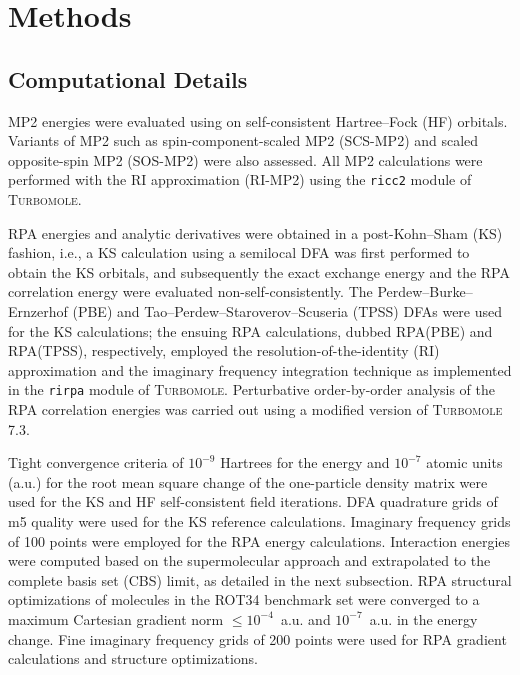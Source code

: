 \documentclass[journal=jctcce,manuscript=article]{achemso}
\begin{document}
\section{Methods}
\label{sec:methods}
\subsection{Computational Details}

MP2 energies were evaluated using on self-consistent Hartree--Fock (HF)
orbitals. 
Variants of MP2 such as spin-component-scaled MP2 (SCS-MP2)\cite{Grimme03JChemPhys118p9095}
and scaled opposite-spin MP2 (SOS-MP2)\cite{doi:10.1063/1.1809602} were also assessed.
All MP2 calculations were performed with the RI approximation (RI-MP2)
using the \texttt{ricc2}
module\cite{b515355g} of \textsc{Turbomole}.\cite{Furche14WIREsComputMolSci4p91}

RPA energies and analytic derivatives were obtained in a post-Kohn--Sham
(KS) fashion, i.e., a KS calculation using a semilocal DFA was first performed to
obtain the KS orbitals, and subsequently the exact exchange energy and the RPA
correlation energy were evaluated non-self-consistently. The
Perdew--Burke--Ernzerhof (PBE)\cite{Perdew96PhysRevLett77p3865} and
Tao--Perdew--Staroverov--Scuseria (TPSS)\cite{Tao03PhysRevLett91p146401}
DFAs were used for the KS calculations; the ensuing RPA calculations,
dubbed RPA(PBE) and RPA(TPSS), respectively, employed the
resolution-of-the-identity (RI) approximation and the imaginary frequency
integration technique as implemented in the \texttt{rirpa} module\cite{Eshuis10JChemPhys132p234114}
of \textsc{Turbomole}.\cite{Furche14WIREsComputMolSci4p91}
Perturbative order-by-order analysis of the RPA correlation energies was carried out using 
a modified version of \textsc{Turbomole 7.3}.

Tight convergence criteria of $10^{-9}$ Hartrees for the energy and
$10^{-7}$ atomic units (a.u.) for the root mean square change of the
one-particle density matrix were used for 
the KS and HF self-consistent field iterations. DFA quadrature grids of
m5 quality\cite{Treutler95JChemPhys102p346} were used for the KS
reference calculations. Imaginary frequency grids of 100 points 
were employed for the RPA energy calculations. Interaction energies
were computed based on the supermolecular approach and extrapolated to
the complete basis set (CBS) limit, as detailed in the next subsection.
RPA structural optimizations\cite{Burow14JChemTheoryComput10p180}
of molecules in the ROT34 benchmark set were converged to a maximum
Cartesian gradient norm $\leq 10^{-4}$~a.u. and $10^{-7}$~a.u. in the
energy change. Fine imaginary frequency grids of 200 points were used
for RPA gradient calculations and structure optimizations.
\end{document}
